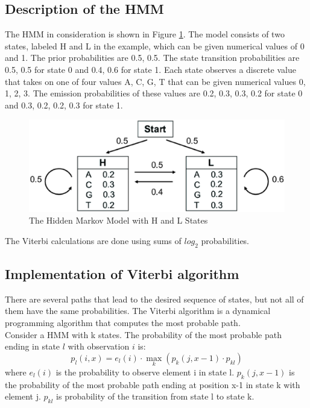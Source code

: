 \documentclass[12pt]{article}
\begin{document}
\subsection{Description of the HMM}
The HMM in consideration is shown in Figure \ref{fig:HMM}. The model consists of two states, labeled H and L in the example, which can be given numerical values of 0 and 1. The prior probabilities are {0.5, 0.5}. The state transition
probabilities are {0.5, 0.5} for state 0 and {0.4, 0.6} for state 1. Each state observes a discrete value that takes on one of four values {A, C, G, T } that can be given numerical values {0, 1, 2, 3}. The emission probabilities of these values are {0.2, 0.3, 0.3, 0.2} for state 0 and {0.3, 0.2, 0.2, 0.3} for state 1.
 
 \begin{figure}[H]
	\centering
	\includegraphics[scale=0.4]{HMM.eps}
	\caption{The Hidden Markov Model with H and L States}
	\label{fig:HMM}
\end{figure}

The Viterbi calculations are done using sums of $log_2$ probabilities.

\subsection{Implementation of Viterbi algorithm}
There are several paths that lead to the desired sequence of states, but not all of them have the same probabilities. The Viterbi algorithm is a dynamical programming algorithm that computes the most probable path. \\

Consider a HMM with k states. The probability of the most probable path ending in state $l$ with observation $i$ is: 
\begin{equation}
	p_l(i,x) = e_l(i) \cdot \displaystyle\max_k(p_k(j,x-1) \cdot p_{kl})
\end{equation}
where $e_l(i)$ is the  probability to observe element i in state l. $p_k(j,x-1)$ is the probability of the most probable path ending at position x-1 in state k with element j. $p_{kl}$ is probability of the transition from state l to state k. \\
\end{document}
